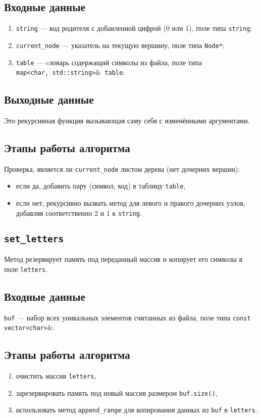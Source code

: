 \subsection*{Входные данные}
\begin{enumerate}
	\item \texttt{string} --- код родителя  с добавленной цифрой (0 или 1), поле типа \texttt{string};	
	\item \texttt{current\_node} --- указатель на текущую вершину, поле типа \texttt{Node*};
	\item \texttt{table} --- cловарь содержащий символы из файла, поле типа \\ \texttt{map<char, std::string>$\&$ table};
\end{enumerate}

\subsection*{Выходные данные}
Это рекурсивная функция вызывающая саму себя с изменёнными аргументами.

\subsection*{Этапы работы алгоритма}
Проверка, является ли \texttt{current\_node} листом дерева (нет дочерних вершин):
\begin{itemize}
	\item если да, добавить пару (символ, код) в таблицу \texttt{table},
	\item если нет, рекурсивно вызвать метод для левого и правого дочерних узлов, добавляя соответственно 2 и 1 к \texttt{string}.
\end{itemize}
	
\subsection{\texttt{set\_letters}}
Метод резервирует память под переданный массив и копирует его символы в поле \texttt{letters}.

\subsection*{Входные данные}
\texttt{buf} --- набор всех уникальных элементов считанных из файла, поле типа \texttt{const \\ vector<char>$\&$}.

\subsection*{Этапы работы алгоритма}
\begin{enumerate}
	\item очистить массив \texttt{letters},
	\item зарезервировать память под новый массив размером \texttt{buf.size()},
	\item использовать метод \texttt{append\_range} для копирования данных из \texttt{buf} в \texttt{letters}.
\end{enumerate}

